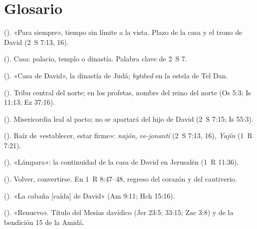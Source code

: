 \section*{Glosario}
\begin{description}\small
\item[Ad olam] (). «Para siempre», tiempo sin límite a la vista. Plazo de la casa y el trono de David (2~S 7:13, 16).
\item[Báyit] (). Casa: palacio, templo o dinastía. Palabra clave de 2~S 7.
\item[Bet David] (). «Casa de David», la dinastía de Judá; \emph{bytdwd} en la estela de Tel Dan.
\item[Efraín] (). Tribu central del norte; en los profetas, nombre del reino del norte (Os 5:3; Is 11:13; Ez 37:16).
\item[Jésed] (). Misericordia leal al pacto; no se apartará del hijo de David (2~S 7:15; Is 55:3).
\item[Kun] (). Raíz de «establecer, estar firme»: \emph{najón}, \emph{ve-jonantí} (2~S 7:13, 16), \emph{Yajín} (1~R 7:21).
\item[Nir] (). «Lámpara»: la continuidad de la casa de David en Jerusalén (1~R 11:36).
\item[Shuv] (). Volver, convertirse. En 1~R 8:47--48, regreso del corazón y del cautiverio.
\item[Sukkat David] (). «La cabaña [caída] de David» (Am 9:11; Hch 15:16).
\item[Tsémaj] (). «Renuevo». Título del Mesías davídico (Jer 23:5; 33:15; Zac 3:8) y de la bendición 15 de la Amidá.
\end{description}

